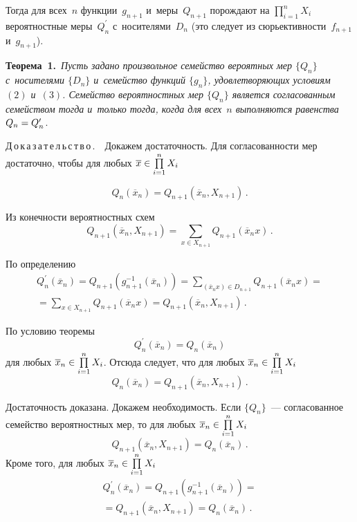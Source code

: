 \begin{multicols}{2}
    Тогда для всех~$n$ функции~$g_{n+1}$ и~меры~$Q_{n+1}$ порождают
на $\prod\limits_{i=1}^n X_i$ вероятностные меры~$Q_n^\prime$
с~носителями~$D_n$ (это следует из сюрьективности~$f_{n+1}$ и~$g_{n+1}$).

    \smallskip

    \noindent
    \textbf{Теорема~1.}\ \textit{Пусть задано произвольное семейство
вероятных мер $\{Q_n\}$ с~носителями $\{D_n\}$ и~семейство функций
$\{g_n\}$, удовлетворяющих условиям~$(2)$ и~$(3)$. Семейство вероятностных
мер $\{Q_n\}$ является согласованным семейством тогда и~только тогда,
когда для всех~$n$ выполняются равенства} $Q_n\hm= Q_n^\prime$.

    \smallskip

    \noindent
    Д\,о\,к\,а\,з\,а\,т\,е\,л\,ь\,с\,т\,в\,о\,.\ \ Докажем достаточность. Для
согласованности мер достаточно, чтобы для любых $\overline{x}\hm\in
\prod\limits_{i=1}^n X_i$

\noindent
    $$
    Q_n\left(\overline{x}_n\right) = Q_{n+1}\left(\overline{x}_n, X_{n+1}\right)\,.
    $$

    Из конечности вероятностных схем
    $$
    Q_{n+1}\left(\overline{x}_n, X_{n+1}\right) = \sum\limits_{x\in X_{n+1}}
    \!\!\!\!\!Q_{n+1} \left (\overline{x}_n x\right)\,.
    $$

    По определению
    \begin{multline*}
    Q_n^\prime\left(\overline{x}_n\right) =Q_{n+1}\left( g_{n+1}^{-1}
    \left(\overline{x}_n\right)\right) = %
    \!\!\!\!\!\!\sum\limits_{(\overline{x}_nx)\in D_{n+1}}\!\!\!\!\!\!\!\!\!\!Q_{n+1} \left(\overline{x}_n
x\right) ={}\\
    {}=    \!\!\!\!\!\!\sum\limits_{x\in X_{n+1}}\!\!\!\!\! Q_{n+1} \left(\overline{x}_n x\right) =
Q_{n+1} \left(\overline{x}_n, X_{n+1}\right)\,.
    \end{multline*}

    По условию теоремы
    $$
    Q_n^\prime \left (\overline{x}_n\right) =Q_n \left(\overline{x}_n\right)
    $$
    для любых
    $\overline{x}_n \hm\in \prod\limits_{i=1}^n X_i$. Отсюда следует, что для любых
$\overline{x}_n\hm\in \prod\limits_{i=1}^n X_i$
    $$
Q_n\left(\overline{x}_n\right) = Q_{n+1}\left(\overline{x}_n, X_{n+1}\right)\,.
$$

    Достаточность доказана. Докажем необходимость. Если $\{Q_n\}$~---
согласованное семейство вероятностных мер, то для любых
$\overline{x}_n\hm\in \prod\limits_{i=1}^n X_i$
    $$
    Q_{n+1}\left(\overline{x}_n, X_{n+1}\right) =Q_n \left(\overline{x}_n\right)\,.
    $$
Кроме того, для любых $\overline{x}_n \hm\in \prod\limits_{i=1}^n X_i$
\begin{multline*}
Q_n^\prime \left(\overline{x}_n\right) =  Q_{n+1} \left( g^{-
1}_{n+1}\left(\overline{x}_n\right)\right) ={}\\
{}=Q_{n+1}\left(\overline{x}_n,
X_{n+1}\right) =Q_n \left(\overline{x}_n\right)\,.
\end{multline*}


\end{multicols}
